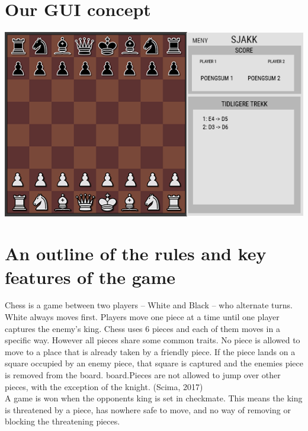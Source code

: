 \documentclass{article}
\begin{document}
    \section{Our GUI concept}
    \begin{center}
        \includegraphics[scale=0.6]{mockup_chess.png}
    \end{center}

    
    
    \section{An outline of the rules and key features of the game}
    \noindent
    Chess is a game between two players  -- White and Black -- who alternate turns. White always moves first. Players move one piece at a time until one player captures the enemy's king.  Chess uses 6 pieces and each of them moves in a specific way. However all pieces share some common traits. No piece is allowed to move to a place that is already taken by a friendly piece. If the piece lands on a square occupied by an enemy piece, that square is captured and the enemies piece is removed from the board. board.Pieces are not allowed to jump over other pieces, with the exception of the knight. (Scima, 2017)\\
A game is won when the opponents king is set in checkmate. This means the king is threatened by a piece, has nowhere
safe to move, and no way of removing or blocking the threatening pieces.\\

\vspace{20mm}
\end{document}

